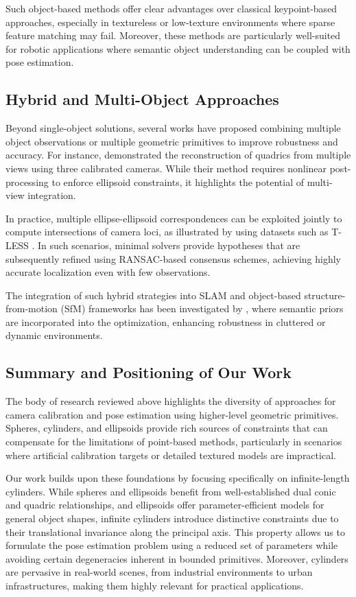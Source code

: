 Such object-based methods offer clear advantages over classical keypoint-based approaches, especially in textureless or low-texture environments where sparse feature matching may fail. Moreover, these methods are particularly well-suited for robotic applications where semantic object understanding can be coupled with pose estimation.

\subsection{Hybrid and Multi-Object Approaches}

Beyond single-object solutions, several works have proposed combining multiple object observations or multiple geometric primitives to improve robustness and accuracy. For instance, \cite{Rubino2018} demonstrated the reconstruction of quadrics from multiple views using three calibrated cameras. While their method requires nonlinear post-processing to enforce ellipsoid constraints, it highlights the potential of multi-view integration.

In practice, multiple ellipse-ellipsoid correspondences can be exploited jointly to compute intersections of camera loci, as illustrated by \cite{gaudilliere2017perspective, gaudilliere2017perspective} using datasets such as T-LESS \cite{Sturm2004}. In such scenarios, minimal solvers provide hypotheses that are subsequently refined using RANSAC-based consensus schemes, achieving highly accurate localization even with few observations.

The integration of such hybrid strategies into SLAM and object-based structure-from-motion (SfM) frameworks has been investigated by \cite{Garg2020}, where semantic priors are incorporated into the optimization, enhancing robustness in cluttered or dynamic environments.

\subsection{Summary and Positioning of Our Work}

The body of research reviewed above highlights the diversity of approaches for camera calibration and pose estimation using higher-level geometric primitives. Spheres, cylinders, and ellipsoids provide rich sources of constraints that can compensate for the limitations of point-based methods, particularly in scenarios where artificial calibration targets or detailed textured models are impractical.

Our work builds upon these foundations by focusing specifically on infinite-length cylinders. While spheres and ellipsoids benefit from well-established dual conic and quadric relationships, and ellipsoids offer parameter-efficient models for general object shapes, infinite cylinders introduce distinctive constraints due to their translational invariance along the principal axis. This property allows us to formulate the pose estimation problem using a reduced set of parameters while avoiding certain degeneracies inherent in bounded primitives. Moreover, cylinders are pervasive in real-world scenes, from industrial environments to urban infrastructures, making them highly relevant for practical applications.

